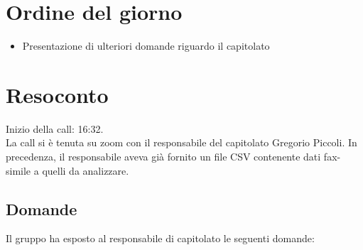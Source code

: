 \section{Ordine del giorno}

\begin{itemize}
	\item Presentazione di ulteriori domande riguardo il capitolato
\end{itemize}

\section{Resoconto}

\noindent 
Inizio della call: 16:32.\\
\noindent La call si è tenuta su zoom con il responsabile del capitolato Gregorio Piccoli. In precedenza, il responsabile aveva già fornito un file CSV contenente dati fax-simile a quelli da analizzare.

\subsection{Domande}
Il gruppo ha esposto al responsabile di capitolato le seguenti domande:

